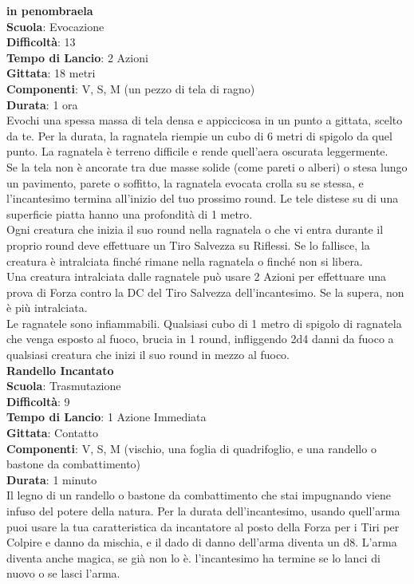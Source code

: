 \begin{multicols}{2}
\medskip\textbf{in penombraela}\\
\textbf{Scuola}: Evocazione\\
\textbf{Difficoltà}:  13\\
\textbf{Tempo di Lancio}: 2 Azioni\\
\textbf{Gittata}: 18 metri\\
\textbf{Componenti}: V, S, M (un pezzo di tela di ragno)\\
\textbf{Durata}: 1 ora\\
Evochi una spessa massa di tela densa e appiccicosa in un punto a gittata, scelto da te. Per la durata, la ragnatela riempie un cubo di 6 metri di spigolo da quel punto. La ragnatela è terreno difficile e rende quell'aera oscurata leggermente.\\
Se la tela non è ancorate tra due masse solide (come pareti o alberi) o stesa lungo un pavimento, parete o soffitto, la ragnatela evocata crolla su se stessa, e l'incantesimo termina all'inizio del tuo prossimo round. Le tele distese su di una superficie piatta hanno una profondità di 1 metro.\\
Ogni creatura che inizia il suo round nella ragnatela o che vi entra durante il proprio round deve effettuare un Tiro Salvezza su Riflessi. Se lo fallisce, la creatura è intralciata finché rimane nella ragnatela o finché non si libera.\\
Una creatura intralciata dalle ragnatele può usare 2 Azioni per effettuare una prova di Forza contro la DC del Tiro Salvezza dell'incantesimo. Se la supera, non è più intralciata.\\
Le ragnatele sono infiammabili. Qualsiasi cubo di 1 metro di spigolo di ragnatela che venga esposto al fuoco, brucia in 1 round, infliggendo 2d4 danni da fuoco a qualsiasi creatura che inizi il suo round in mezzo al fuoco.\\

\medskip\textbf{Randello Incantato}\\
\textbf{Scuola}: Trasmutazione\\
\textbf{Difficoltà}:  9\\
\textbf{Tempo di Lancio}: 1 Azione Immediata\\
\textbf{Gittata}: Contatto\\
\textbf{Componenti}: V, S, M (vischio, una foglia di quadrifoglio, e una randello o bastone da combattimento)\\
\textbf{Durata}: 1 minuto\\
Il legno di un randello o bastone da combattimento che stai impugnando viene infuso del potere della natura. Per la durata dell'incantesimo, usando quell'arma puoi usare la tua caratteristica da incantatore al posto della Forza per i Tiri per Colpire e danno da mischia, e il dado di danno dell'arma diventa un d8. L’arma diventa anche magica, se già non lo è. l'incantesimo ha termine se lo lanci di nuovo o se lasci l’arma.


\end{multicols}
